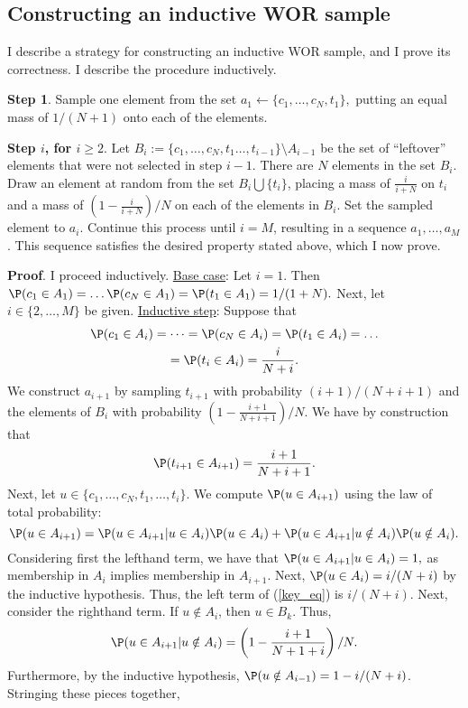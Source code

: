 \documentclass[12pt]{article}
\begin{document}
\subsection*{Constructing an inductive WOR sample}

I describe a strategy for constructing an inductive WOR sample, and I prove its correctness. I describe the procedure inductively.

\textbf{Step 1}. Sample one element from the set $a_1 \leftarrow \{c_1, \dots, c_N, t_1\},$ putting an equal mass of  $1/(N + 1)$ onto each of the elements.

\textbf{Step $i$, for $i \geq 2$}. Let $B_i := \{c_1, \dots, c_N, t_1 \dots, t_{i-1} \} \setminus A_{i-1}$ be the set of ``leftover'' elements that were not selected in step $i-1$. There are $N$ elements in the set $B_i$. Draw an element at random from the set $B_i \bigcup \{ t_i \}$, placing a mass of $\frac{i}{i + N}$ on $t_i$ and a mass of $\left(1 - \frac{i}{i + N} \right)/N$ on each of the elements in $B_i$. Set the sampled element to $a_i$. Continue this process until $i = M$, resulting in a sequence $a_1,\dots,a_M$. This sequence satisfies the desired property stated above, which I now prove.

\textbf{Proof}. I proceed inductively. \underline{Base case}: Let $i = 1$. Then $\P(c_1 \in A_1) = \dots \P(c_N \in A_1) = \P(t_1 \in A_1) = 1/(1+N).$ Next, let $i \in \{2, \dots, M \}$ be given. \underline{Inductive step}: Suppose that 
\begin{multline*}
\P(c_1 \in A_{i}) = \dots = \P(c_N \in A_{i}) = \P( t_1 \in A_{i} ) = \dots \\ = \P(t_{i} \in A_{i}) = \frac{i}{N + i}.
\end{multline*}
We construct $a_{i+1}$ by sampling $t_{i+1}$ with probability $(i+1)/(N + i + 1)$ and the elements of $B_i$ with probability $\left(1 - \frac{i + 1}{N+i + 1}\right)/N$. We have by construction that $$\P(t_{i+1} \in A_{i+1}) = \frac{i+1}{N+i+1}.$$ Next, let $u \in \{c_1, \dots, c_N, t_1, \dots, t_{i} \}$. We compute $\P(u \in A_{i+1})$ using the law of total probability:
\begin{equation}\label{key_eq}
\P(u \in A_{i+1}) = \P(u \in A_{i+1} | u \in A_{i}) \P(u \in A_{i}) + \P(u \in A_{i+1} | u \notin A_{i}) \P(u \notin A_{i}).
\end{equation}
Considering first the lefthand term, we have that $\P(u \in A_{i+1} | u \in A_{i}) = 1,$ as membership in $A_{i}$ implies membership in $A_{i+1}$. Next, $\P(u \in A_{i}) = i/(N + i)$ by the inductive hypothesis. Thus, the left term of (\ref{key_eq}) is
$i/(N + i).$ Next, consider the righthand term. If $u \notin A_{i}$, then $u \in B_k$. Thus, $$ \P(u \in A_{i+1} | u \notin A_{i}) = \left(1 - \frac{i+1}{N+1+i}\right)/N.$$ Furthermore, by the inductive hypothesis, $\P(u \notin A_{i-1}) = 1 - i/(N + i)$. Stringing these pieces together,
\end{document}
